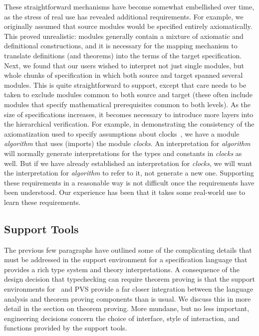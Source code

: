 These straightforward mechanisms have become somewhat embellished over
time, as the stress of real use has revealed additional requirements.
For example, we originally assumed that source modules would be
specified entirely axiomatically.  This proved unrealistic: modules
generally contain a mixture of axiomatic and definitional
constructions, and it is necessary for the mapping mechanism to
translate definitions (and theorems) into the terms of the target
specification.  Next, we found that our users wished to interpret not
just single modules, but whole chunks of specification in which both
source and target spanned several modules.  This is quite
straightforward to support, except that care needs to be taken to
exclude modules common to both source and target (these often include
modules that specify mathematical prerequisites common to both
levels).  As the size of specifications increases, it becomes necessary
to introduce more layers into the hierarchical verification.  For
example, in demonstrating the consistency of the axiomatization used
to specify assumptions about clocks~\cite{Rushby&vonHenke93},
we have a module {\em algorithm\/} that uses (imports) the module {\em
clocks\/}.  An interpretation for {\em algorithm\/} will normally
generate interpretations for the types and constants in {\em clocks\/}
as well.  But if we have already established an interpretation for
{\em clocks\/}, we will want the interpretation for {\em algorithm\/}
to refer to it, not generate a new one.  Supporting these requirements
in a reasonable way is not difficult once the requirements have been
understood.  Our experience has been that it takes some real-world use
to learn these requirements.

\subsection{Support Tools}

The previous few paragraphs have outlined some of the complicating
details that must be addressed in the support environment for a
specification language that provides a rich type system and theory
interpretations.  A consequence of the design decision that
typechecking can require theorem proving is that the support
environments for \ehdm\ and PVS provide a far closer integration
between the language analysis and theorem proving components than is
usual.  We discuss this in more detail in the section on theorem
proving.  More mundane, but no less important, engineering decisions
concern the choice of interface, style of interaction, and functions
provided by the support tools.

